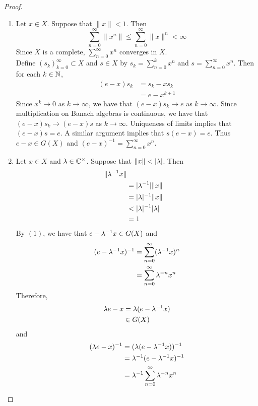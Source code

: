 \documentclass{book}
\begin{document}
\begin{proof}\
	\begin{enumerate}
		\item Let $x \in X$. Suppose that $\|x \|< 1$. Then $$\sum_{n=0}^{\infty} \|x^n \| \leq \sum_{n=0}^{\infty} \|x \|^{n} < \infty$$ Since $X$ is a complete, $\sum\limits_{n=0}^{\infty}x^n$ converges in $X$.\\
		Define $(s_k)_{k=0}^{\infty} \subset X$ and $s \in X$ by $s_k = \sum\limits_{n=0}^{k} x^n$ and  $s = \sum\limits_{n=0}^{\infty}x^n$. Then for each $k \in \mathbb{N}$,
		\begin{align*}
			(e - x) s_k
			& = s_k - x s_k \\
			&= e - x^{k+1} 
		\end{align*}
		Since $x^k \rightarrow 0$ as $k \rightarrow \infty$,  we have that $(e- x)s_k \rightarrow e$ as $k \rightarrow \infty$. Since multiplication on Banach algebras is continuous, we have that $(e - x)s_k \rightarrow (e-x)s$ as $k \rightarrow \infty$. Uniqueness of limits implies that $(e-x)s = e$. A similar argument implies that $s(e-x) = e$. Thus $e - x \in G(X)$ and $(e-x)^{-1} = \sum\limits_{n=0}^{\infty}x^n$. \vspace{.5cm}\\
		\item Let $x \in X$ and $\lambda \in \mathbb{C}^{\times}$. Suppose that $\|x\| < |\lambda |$. Then 
		\begin{align*}
			\|\lambda^{-1} x\| \\
			& = |\lambda^{-1}| \|x \| \\
			& = |\lambda |^{-1} \|x\| \\
			& < |\lambda |^{-1} |\lambda | \\
			& = 1
		\end{align*}
		By $(1)$, we have that $e - \lambda^{-1}x \in G(X)$ and 
		\begin{align*}
			(e - \lambda^{-1}x)^{-1} 
			& = \sum_{n=0}^{\infty} (\lambda^{-1}x)^n \\
			& = \sum_{n=0}^{\infty} \lambda^{-n} x^n 
		\end{align*}
		Therefore, 
		\begin{align*}
			\lambda e - x
			& = \lambda (e - \lambda^{-1}x) \\
			& \in G(X)
		\end{align*}
		and 
		\begin{align*}
			(\lam e - x)^{-1}
			& = (\lam (e - \lam^{-1}x))^{-1} \\
			& = \lam^{-1}(e - \lam^{-1}x)^{-1} \\
			& = \lam^{-1} \sum_{n=0}^{\infty} \lam^{-n} x^n  \\

\end{align*}
\end{enumerate}
\end{proof}
\end{document}
